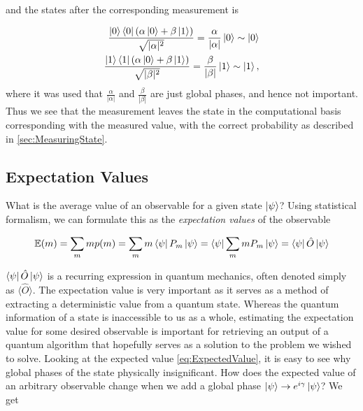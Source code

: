 and the states after the corresponding measurement is 


\begin{equation}\label{eq:CompBasisMeasurement}
\begin{aligned}
    \frac{\ket{0}\bra{0}(\alpha \ket{0} + \beta \ket{1})}{\sqrt{|\alpha|^2}} = 
    \frac{\alpha}{|\alpha|} \ket{0} \sim \ket{0} \\
    \frac{\ket{1}\bra{1}(\alpha \ket{0} + \beta \ket{1})}{\sqrt{|\beta|^2}} = 
    \frac{\beta}{|\beta|} \ket{1} \sim \ket{1},
\end{aligned}
\end{equation}
where it was used that $\frac{\alpha}{|\alpha|}$ and $\frac{\beta}{|\beta|}$ are just global phases, and hence not important. Thus we see that the measurement leaves the state in the computational basis corresponding with the measured value, with the correct probability as described in \autoref{sec:MeasuringState}.

\subsection{Expectation Values}\label{sec:ExpectationValues}

What is the average value of an observable for a given state $\ket{\psi}$? Using statistical formalism, we can formulate this as the \emph{expectation values} of the observable

\begin{equation}\label{eq:ExpectedValue}
    \mathbb{E}(m) = \sum_m m p(m) = \sum_m m \bra{\psi}P_m\ket{\psi} = \bra{\psi}\sum_m m P_m\ket{\psi} = \bra{\psi}\hat{O}\ket{\psi}
\end{equation}

$\bra{\psi}\hat{O}\ket{\psi}$ is a recurring expression in quantum mechanics, often denoted simply as $\langle \hat{O} \rangle$. The expectation value is very important as it serves as a method of extracting a deterministic value from a quantum state. Whereas the quantum information of a state is inaccessible to us as a whole, estimating the expectation value for some desired observable is important for retrieving an output of a quantum algorithm that hopefully serves as a solution to the problem we wished to solve. Looking at the expected value \autoref{eq:ExpectedValue}, it is easy to see why global phases of the state physically insignificant. How does the expected value of an arbitrary observable change when we add a global phase $\ket{\psi} \rightarrow e^{i\gamma}\ket{\psi}$? We get

